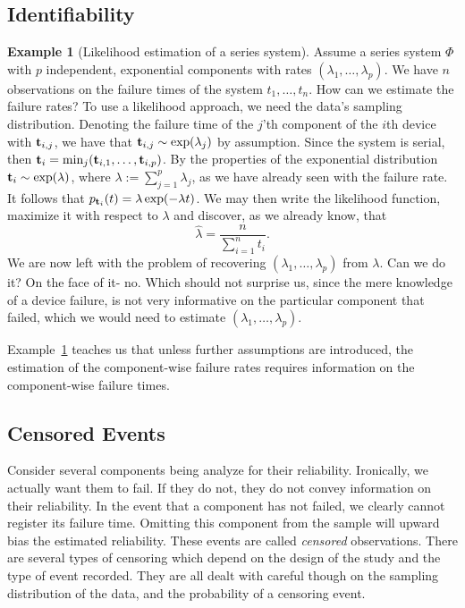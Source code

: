 \documentclass[12pt,a4paper]{report}
\theoremstyle{plain}
\theoremstyle{definition}
\newtheorem{example}{Example}
\begin{document}
\subsection{Identifiability}

\begin{example}[Likelihood estimation of a series system]
\label{eg:likelihood_of_failures}
Assume a series system $\Phi$ with $p$ independent, exponential components with rates $(\lambda_1,\dots,\lambda_p)$.
We have $n$ observations on the failure times of the system $t_1,\dots,t_n$.
How can we estimate the failure rates?
To use a likelihood approach, we need the data's sampling distribution.
Denoting the failure time of the $j$'th component of the $i$th device with $\mathbf{t}_{i,j}$, we have that $\mathbf{t}_{i,j}\sim \exp(\lambda_j)$ by assumption.
Since the system is serial, then $\mathbf{t}_i=\min_j(\mathbf{t}_{i,1},\dots,\mathbf{t}_{i,p})$.
By the properties of the exponential distribution $\mathbf{t}_i \sim \exp(\lambda)$, where $\lambda:=\sum_{j=1}^{p} \lambda_j$, as we have already seen with the failure rate. It follows that
$p_{\mathbf{t}_i} (t)=\lambda \exp(-\lambda t)$.
We may then write the likelihood function, maximize it with respect to $\lambda$ and discover, as we already know, that $$\hat{\lambda}=\frac{n}{\sum_{i=1}^{n} t_i}.$$
We are now left with the problem of recovering $(\lambda_1,\dots,\lambda_p)$ from $\lambda$. 
Can we do it? On the face of it- no. Which should not surprise us, since the mere knowledge of a device failure, is not very informative on the particular component that failed, which we would need to estimate $(\lambda_1,\dots,\lambda_p)$.
\end{example}

Example~\ref{eg:likelihood_of_failures} teaches us that unless further assumptions are introduced, the estimation of the component-wise failure rates requires information on the component-wise failure times. 





\subsection{Censored Events}
Consider several components being analyze for their reliability. 
Ironically, we actually want them to fail. If they do not, they do not convey information on their reliability.
In the event that a component has not failed, we clearly cannot register its failure time. Omitting this component from the sample will upward bias the estimated reliability.
These events are called \emph{censored} observations. 
There are several types of censoring which depend on the design of the study and the type of event recorded. 
They are all dealt with careful though on the sampling distribution of the data, and the probability of a censoring event. 
\end{document}
